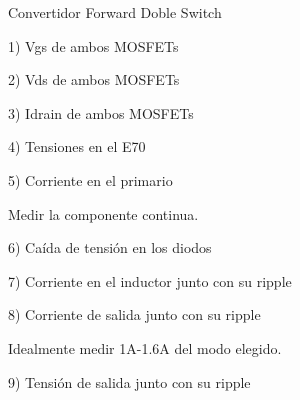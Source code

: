 Convertidor Forward Doble Switch 

1) Vgs de ambos MOSFETs

2) Vds de ambos MOSFETs

3) Idrain de ambos MOSFETs

4) Tensiones en el E70

5) Corriente en el primario

Medir la componente continua. 

6) Caída de tensión en los diodos

7) Corriente en el inductor junto con su ripple

8) Corriente de salida junto con su ripple 

Idealmente medir 1A-1.6A del modo elegido. 

9) Tensión de salida junto con su ripple 
